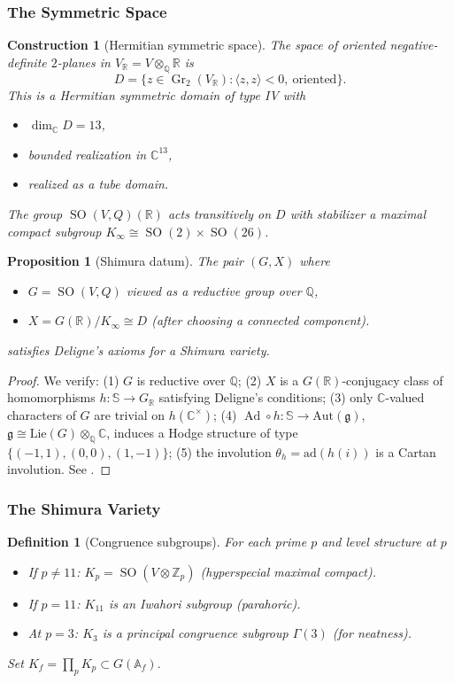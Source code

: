 \documentclass[12pt]{amsart}
\newtheorem{proposition}[theorem]{Proposition}
\newtheorem{definition}[theorem]{Definition}
\newtheorem{construction}[theorem]{Construction}
\theoremstyle{definition}
\DeclareMathOperator\SO{SO}
\DeclareMathOperator\Ad{Ad}
\DeclareMathOperator\Gr{Gr}
\newcommand{\A}{\mathbb{A}}
\newcommand{\Q}{\mathbb{Q}}
\newcommand{\R}{\mathbb{R}}
\newcommand{\C}{\mathbb{C}}
\newcommand{\Z}{\mathbb{Z}}
\newcommand{\tensor}{\otimes}
\newcommand{\Lie}{\mathrm{Lie}}
\newcommand{\Aut}{\mathrm{Aut}}
\begin{document}
\subsubsection{The Symmetric Space}

\begin{construction}[Hermitian symmetric space]
The space of oriented negative-definite $2$-planes in $V_{\R} = V \tensor_{\Q} \R$ is
\[
D = \{ z \in \Gr_2(V_{\R}) : \langle z, z \rangle < 0,\ \text{oriented} \}.
\]
This is a Hermitian symmetric domain of type IV with
\begin{itemize}[nosep]
\item $\dim_{\C} D = 13$,
\item bounded realization in $\C^{13}$,
\item realized as a tube domain.
\end{itemize}
The group $\SO(V, Q)(\R)$ acts transitively on $D$ with stabilizer a maximal compact subgroup $K_{\infty} \cong \SO(2) \times \SO(26)$.
\end{construction}

\begin{proposition}[Shimura datum]
The pair $(G, X)$ where
\begin{itemize}[nosep]
\item $G = \SO(V, Q)$ viewed as a reductive group over $\Q$,
\item $X = G(\R)/K_{\infty} \cong D$ (after choosing a connected component).
\end{itemize}
satisfies Deligne's axioms for a Shimura variety.
\end{proposition}
\begin{proof}
We verify: (1) $G$ is reductive over $\Q$; (2) $X$ is a $G(\R)$-conjugacy class of homomorphisms $h \colon \mathbb{S} \to G_{\R}$ satisfying Deligne's conditions; (3) only $\C$-valued characters of $G$ are trivial on $h(\C^{\times})$; (4) $\Ad \circ h \colon \mathbb{S} \to \Aut(\mathfrak{g})$, $\mathfrak{g}\cong \Lie(G)\otimes_{\Q} \C$, induces a Hodge structure  of type
 $\{(-1, 1), (0, 0), (1, -1)\}$; (5) the involution $\theta_h= \text{ad}(h(i))$ is a Cartan involution. See \cite{Deligne-Shimura}.
\end{proof}

\subsubsection{The Shimura Variety}

\begin{definition}[Congruence subgroups]
For each prime $p$ and level structure at $p$
\begin{itemize}[nosep]
\item If $p \neq 11$: $K_p = \SO(V \tensor \Z_p)$ (hyperspecial maximal compact).
\item If $p = 11$: $K_{11}$ is an Iwahori subgroup (parahoric).
\item At $p = 3$: $K_3$ is a principal congruence subgroup $\Gamma(3)$ (for neatness).
\end{itemize}
Set $K_f = \prod_p K_p \subset G(\A_f)$.
\end{definition}
\end{document}
